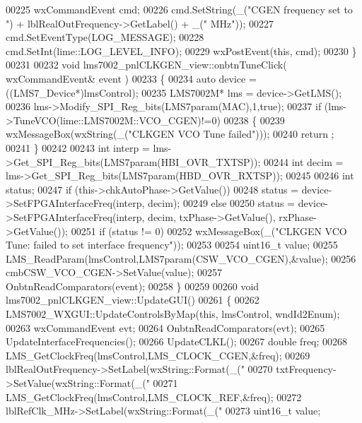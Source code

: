 \begin{DoxyCode}
{{{{{{{{{00225     wxCommandEvent cmd;
00226     cmd.SetString(\_(\textcolor{stringliteral}{"CGEN frequency set to "}) + lblRealOutFrequency->GetLabel() + \_(\textcolor{stringliteral}{" MHz"}));
00227     cmd.SetEventType(LOG\_MESSAGE);
00228     cmd.SetInt(lime::LOG_LEVEL_INFO);
00229     wxPostEvent(\textcolor{keyword}{this}, cmd);
00230 \}
00231 
00232 \textcolor{keywordtype}{void} lms7002_pnlCLKGEN_view::onbtnTuneClick( wxCommandEvent& event )
00233 \{
00234     \textcolor{keyword}{auto} device = ((LMS7_Device*)lmsControl);
00235     LMS7002M* lms = device->GetLMS();
00236     lms->Modify_SPI_Reg_bits(LMS7param(MAC),1,\textcolor{keyword}{true});
00237     \textcolor{keywordflow}{if} (lms->TuneVCO(lime::LMS7002M::VCO_CGEN)!=0)
00238     \{
00239         wxMessageBox(wxString(\_(\textcolor{stringliteral}{"CLKGEN VCO Tune failed"})));
00240         return ;
00241     \}
00242 
00243     \textcolor{keywordtype}{int} interp = lms->Get_SPI_Reg_bits(LMS7param(HBI_OVR_TXTSP));
00244     \textcolor{keywordtype}{int} decim = lms->Get_SPI_Reg_bits(LMS7param(HBD_OVR_RXTSP));
00245 
00246     \textcolor{keywordtype}{int} status;
00247     \textcolor{keywordflow}{if} (this->chkAutoPhase->GetValue())
00248         status = device->SetFPGAInterfaceFreq(interp, decim);
00249     \textcolor{keywordflow}{else}
00250         status = device->SetFPGAInterfaceFreq(interp, decim, txPhase->GetValue(), 
      rxPhase->GetValue());
00251     \textcolor{keywordflow}{if} (status != 0)
00252         wxMessageBox(\_(\textcolor{stringliteral}{"CLKGEN VCO Tune: failed to set interface frequency"}));
00253 
00254     uint16\_t value;
00255     LMS_ReadParam(lmsControl,LMS7param(CSW_VCO_CGEN),&value);
00256     cmbCSW_VCO_CGEN->SetValue(value);
00257     OnbtnReadComparators(event);
00258 \}
00259 
00260 \textcolor{keywordtype}{void} lms7002_pnlCLKGEN_view::UpdateGUI()
00261 \{
00262     LMS7002_WXGUI::UpdateControlsByMap(\textcolor{keyword}{this}, lmsControl, wndId2Enum);
00263     wxCommandEvent evt;
00264     OnbtnReadComparators(evt);
00265     UpdateInterfaceFrequencies();
00266     UpdateCLKL();
00267     \textcolor{keywordtype}{double} freq;
00268     LMS_GetClockFreq(lmsControl,LMS_CLOCK_CGEN,&freq);
00269     lblRealOutFrequency->SetLabel(wxString::Format(\_(\textcolor{stringliteral}{"%
00270     txtFrequency->SetValue(wxString::Format(\_(\textcolor{stringliteral}{"%
00271     LMS_GetClockFreq(lmsControl,LMS_CLOCK_REF,&freq);
00272     lblRefClk_MHz->SetLabel(wxString::Format(\_(\textcolor{stringliteral}{"%
00273     uint16\_t value;
}}}}}}}}}}}}
\end{DoxyCode}
